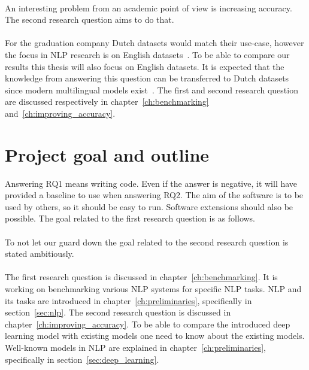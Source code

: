 \rqone \\[1mm]

An interesting problem from an academic point of view is increasing accuracy.
The second research question aims to do that.\\

\rqtwo \\[1mm]

For the graduation company Dutch datasets would match their use-case, however the focus in NLP research is on English datasets~\citep{cambria2014jumping,young2018recent}.
To be able to compare our results this thesis will also focus on English datasets.
It is expected that the knowledge from answering this question can be transferred to Dutch datasets since modern multilingual models exist~\citep{spacy2019models,subramanian2018learning,devlin2018}.
The first and second research question are discussed respectively in chapter~\ref{ch:benchmarking} and~\ref{ch:improving_accuracy}.

\section{Project goal and outline}
\label{sec:project_goal}
Answering RQ1 means writing code.
Even if the answer is negative, it will have provided a baseline to use when answering RQ2.
The aim of the software is to be used by others, so it should be easy to run.
Software extensions should also be possible.
The goal related to the first research question is as follows.\\

\rgone \\

\noindent To not let our guard down the goal related to the second research question is stated ambitiously.\\

\rgtwo \\

The first research question is discussed in chapter~\ref{ch:benchmarking}.
It is working on benchmarking various NLP systems for specific NLP tasks.
NLP and its tasks are introduced in chapter~\ref{ch:preliminaries}, specifically in section~\ref{sec:nlp}.
The second research question is discussed in chapter~\ref{ch:improving_accuracy}.
To be able to compare the introduced deep learning model with existing models one need to know about the existing models.
Well-known models in NLP are explained in chapter~\ref{ch:preliminaries}, specifically in section~\ref{sec:deep_learning}.